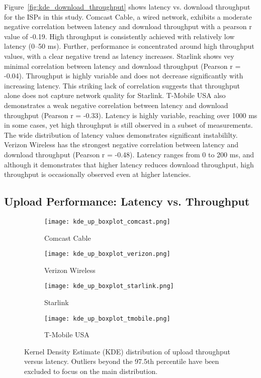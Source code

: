 Figure~\ref{fig:kde_download_throughput} shows latency vs. download throughput for the ISPs in this study. Comcast Cable, a wired network, exhibits a 
moderate negative correlation between latency and download throughput with a pearson r value of -0.19. High throughput is consistently achieved 
with relatively low latency (0–50 ms). Further, performance is concentrated around high throughput values, 
with a clear negative trend as latency increases. Starlink shows vey minimal correlation between 
latency and download throughput (Pearson r = -0.04). Throughput is highly variable and does not decrease 
significantly with increasing latency. This striking lack of correlation suggests that throughput alone 
does not capture network quality for Starlink. T-Mobile USA also demonstrates a weak negative correlation between latency 
and download throughput (Pearson r = -0.33). Latency is highly variable, reaching over 1000 ms in some cases, 
yet high throughput is still observed in a subset of measurements. The wide distribution of latency values demonstrates 
significant instabililty. Verizon Wireless has the strongest negative correlation between latency and download 
throughput (Pearson r = -0.48). Latency ranges from 0 to 200 ms, and although it demonstrates that higher latency 
reduces download throughput, high throughput is occasionally observed even at higher latencies.

\subsection{Upload Performance: Latency vs. Throughput}

\begin{figure}[H]
    \centering
    \begin{subfigure}{0.48\textwidth}
        \centering
        \texttt{[image: kde\_up\_boxplot\_comcast.png]}
        \caption{Comcast Cable}
    \end{subfigure}

    \begin{subfigure}{0.48\textwidth}
        \centering
        \texttt{[image: kde\_up\_boxplot\_verizon.png]}
        \caption{Verizon Wireless}
    \end{subfigure}
        
    \begin{subfigure}{0.48\textwidth}
        \centering
        \texttt{[image: kde\_up\_boxplot\_starlink.png]}
        \caption{Starlink}
    \end{subfigure}

    \begin{subfigure}{0.48\textwidth}
        \centering
        \texttt{[image: kde\_up\_boxplot\_tmobile.png]}
        \caption{T-Mobile USA}
    \end{subfigure}
    
    \caption{Kernel Density Estimate (KDE) distribution of upload throughput versus latency. Outliers beyond the 97.5th percentile have been excluded to focus on the main distribution.}
    \label{fig:kde_upload_throughput}
\end{figure}


